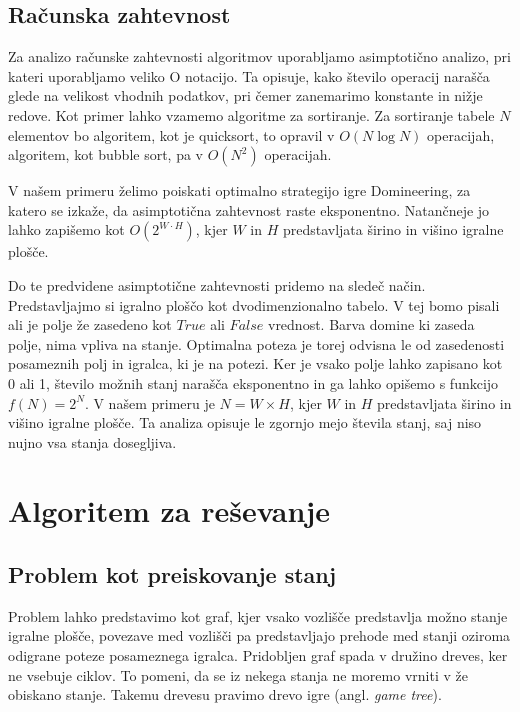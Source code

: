 \documentclass[12pt]{report}
\begin{document}
\section{Računska zahtevnost}
Za analizo računske zahtevnosti algoritmov uporabljamo asimptotično analizo, pri kateri uporabljamo veliko O notacijo. Ta opisuje, kako število operacij narašča glede na velikost vhodnih podatkov, pri čemer zanemarimo konstante in nižje redove. Kot primer lahko vzamemo algoritme za sortiranje. Za sortiranje tabele $N$ elementov bo algoritem, kot je quicksort, to opravil v $O(N \log N)$ operacijah, algoritem, kot bubble sort, pa v $O(N^2)$ operacijah.

V našem primeru želimo poiskati optimalno strategijo igre Domineering, za katero se izkaže, da asimptotična zahtevnost raste eksponentno. Natančneje jo lahko zapišemo kot $O(2^{W \cdot H})$, kjer $W$ in $H$ predstavljata širino in višino igralne plošče.

Do te predvidene asimptotične zahtevnosti pridemo na sledeč način. Predstavljajmo si igralno ploščo kot dvodimenzionalno tabelo. V tej bomo pisali ali je polje že zasedeno kot $True$ ali $False$ vrednost. Barva domine ki zaseda polje, nima vpliva na stanje. Optimalna poteza je torej odvisna le od zasedenosti posameznih polj in igralca, ki je na potezi. Ker je vsako polje lahko zapisano kot 0 ali 1, število možnih stanj narašča eksponentno in ga lahko opišemo s funkcijo $f(N) = 2^{N}$. V našem primeru je $N = W \times H$, kjer $W$ in $H$ predstavljata širino in višino igralne plošče. Ta analiza opisuje le zgornjo mejo števila stanj, saj niso nujno vsa stanja dosegljiva.



\chapter{Algoritem za reševanje}
\section{Problem kot preiskovanje stanj}
Problem lahko predstavimo kot graf, kjer vsako vozlišče predstavlja možno stanje igralne plošče, povezave med vozlišči pa predstavljajo prehode med stanji oziroma odigrane poteze posameznega igralca. Pridobljen graf spada v družino dreves, ker ne vsebuje ciklov. To pomeni, da se iz nekega stanja ne moremo vrniti v že obiskano stanje. Takemu drevesu pravimo drevo igre (angl. \textit{game tree}). 
\end{document}

